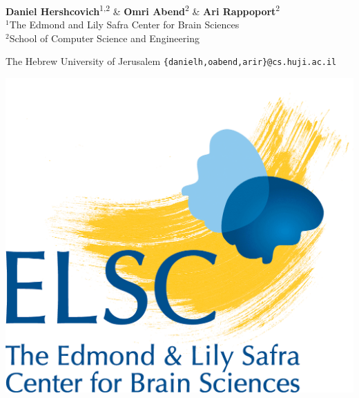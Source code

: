 \documentclass[a0,portrait]{a0poster}
\begin{document}
\hspace{1cm}
\begin{minipage}[b]{0.57\linewidth}
\LARGE \textbf{Daniel Hershcovich}\textsuperscript{1,2} \&
	   \textbf{Omri Abend}\textsuperscript{2} \&
	   \textbf{Ari Rappoport}\textsuperscript{2} \\[0.5cm] %
\Large $^1$The Edmond and Lily Safra Center for Brain Sciences \\
  $^2$School of Computer Science and Engineering
  \setlength{\columnseprule}{0pt}
  \setlength\multicolsep{-20pt}
  \begin{multicols}{2}
  The Hebrew University of Jerusalem
  \large \texttt{\{danielh,oabend,arir\}@cs.huji.ac.il}
  \end{multicols}
\end{minipage}
\hfill
\begin{minipage}[b]{.13\linewidth}
\includegraphics[width=\linewidth]{elsc_logo.png}
\end{minipage}

\vspace{1cm} %
\titlespacing*{\section}{0pt}{8mm}{5mm}
\end{document}
